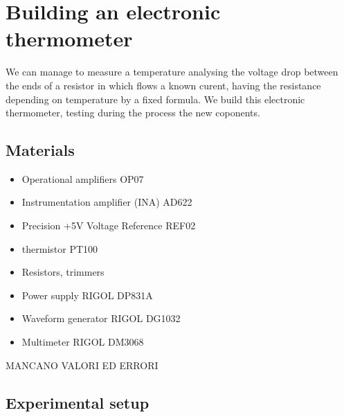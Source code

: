 \chapter{Building an electronic thermometer}
We can manage to measure a temperature analysing the voltage drop between the ends of a resistor in which flows a known curent, having the resistance depending on temperature by a fixed formula.
We build this electronic thermometer, testing during the process the new coponents.

\section{Materials}
\begin{itemize}
\item Operational amplifiers OP07
\item Instrumentation amplifier (INA) AD622
\item Precision +5V Voltage Reference REF02
\item thermistor PT100
\item Resistors, trimmers
\item Power supply RIGOL DP831A
\item Waveform generator RIGOL DG1032
\item Multimeter RIGOL DM3068
\end{itemize}
MANCANO VALORI ED ERRORI 

\section{Experimental setup}

